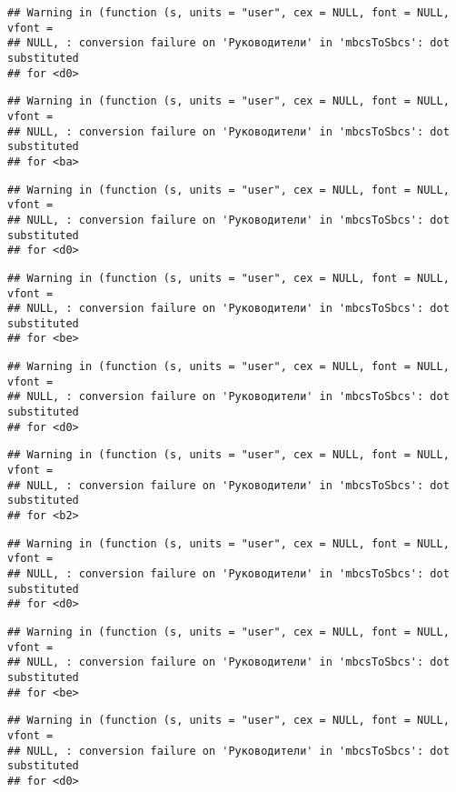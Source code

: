 \documentclass[
]{article}
\begin{document}
\begin{verbatim}
## Warning in (function (s, units = "user", cex = NULL, font = NULL, vfont =
## NULL, : conversion failure on 'Руководители' in 'mbcsToSbcs': dot substituted
## for <d0>
\end{verbatim}

\begin{verbatim}
## Warning in (function (s, units = "user", cex = NULL, font = NULL, vfont =
## NULL, : conversion failure on 'Руководители' in 'mbcsToSbcs': dot substituted
## for <ba>
\end{verbatim}

\begin{verbatim}
## Warning in (function (s, units = "user", cex = NULL, font = NULL, vfont =
## NULL, : conversion failure on 'Руководители' in 'mbcsToSbcs': dot substituted
## for <d0>
\end{verbatim}

\begin{verbatim}
## Warning in (function (s, units = "user", cex = NULL, font = NULL, vfont =
## NULL, : conversion failure on 'Руководители' in 'mbcsToSbcs': dot substituted
## for <be>
\end{verbatim}

\begin{verbatim}
## Warning in (function (s, units = "user", cex = NULL, font = NULL, vfont =
## NULL, : conversion failure on 'Руководители' in 'mbcsToSbcs': dot substituted
## for <d0>
\end{verbatim}

\begin{verbatim}
## Warning in (function (s, units = "user", cex = NULL, font = NULL, vfont =
## NULL, : conversion failure on 'Руководители' in 'mbcsToSbcs': dot substituted
## for <b2>
\end{verbatim}

\begin{verbatim}
## Warning in (function (s, units = "user", cex = NULL, font = NULL, vfont =
## NULL, : conversion failure on 'Руководители' in 'mbcsToSbcs': dot substituted
## for <d0>
\end{verbatim}

\begin{verbatim}
## Warning in (function (s, units = "user", cex = NULL, font = NULL, vfont =
## NULL, : conversion failure on 'Руководители' in 'mbcsToSbcs': dot substituted
## for <be>
\end{verbatim}

\begin{verbatim}
## Warning in (function (s, units = "user", cex = NULL, font = NULL, vfont =
## NULL, : conversion failure on 'Руководители' in 'mbcsToSbcs': dot substituted
## for <d0>
\end{verbatim}
\end{document}
